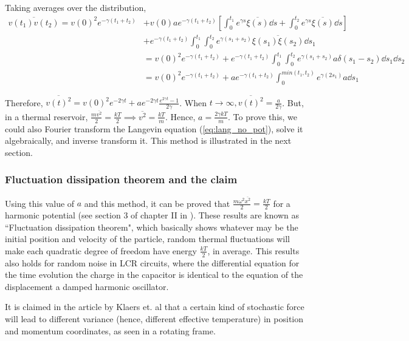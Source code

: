 \documentclass[12pt, twoside]{article}
\begin{document}
Taking averages over the distribution,\\
$\begin{aligned}\overline{v(t_1) v(t_2)} = v(0)^2 e^{-\gamma(t_1 + t_2)} &+ v(0) a e^{-\gamma(t_1 + t_2)} \left[\int_{0}^{t_1} e^{\gamma s} \overline{\xi(s)} \dd{s} + \int_{0}^{t_2} e^{\gamma s} \overline{\xi(s)} \dd{s}\right] \\&+ e^{-\gamma(t_1 + t_2)} \int_{0}^{t_1}\int_{0}^{t_2} e^{\gamma(s_1 + s_2)} \overline{\xi(s_1)\xi(s_2)} \dd{s_1} \\ &= v(0)^2 e^{-\gamma(t_1 + t_2)} + e^{-\gamma(t_1 + t_2)} \int_{0}^{t_1}\int_{0}^{t_2} e^{\gamma(s_1 + s_2)} {a} \delta(s_1 - s_2) \dd{s_1} \dd{s_2} \\ &= v(0)^2 e^{-\gamma(t_1 + t_2)} + a  e^{-\gamma(t_1 + t_2)} \int_{0}^{min(t_1,t_2)} e^{\gamma(2 s_1)} {a} \dd{s_1} \end{aligned}$

Therefore, $\overline{v(t)^2} = v(0)^2 e^{-2\gamma t} + a e^{-2\gamma t}\frac{e^{2\gamma t} - 1}{2\gamma}$. When $t \rightarrow \infty, \overline{v(t)^2} = \frac{a}{2\gamma}$. But, in a thermal reservoir, $\frac{m\overline{v^2}}{2} =\frac{k T}{2} \implies \overline{v^2} = \frac{kT}{m}$. Hence, $a = \frac{2 \gamma k T}{m}$. To prove this, we could also Fourier transform the Langevin equation (\ref{eq:lang_no_pot}), solve it algebraically, and inverse transform it. This method is illustrated in the next section.
\subsubsection{Fluctuation dissipation theorem and the claim}
Using this value of $a$ and this method, it can be proved that $\frac{m \omega^2 \overline{x^2}}{2} = \frac{k T}{2}$ for a harmonic potential (see section 3 of chapter II in \cite{chandrashekhar_stochastic_physics_astro}). These results are known as ``Fluctuation dissipation theorem", which basically shows whatever may be the initial position and velocity of the particle, random thermal fluctuations will make each quadratic degree of freedom have energy $\frac{kT}{2}$, in average. This results also holds for random noise in LCR circuits, where the differential equation for the time evolution the charge in the capacitor is identical to the equation of the displacement a damped harmonic oscillator. 

It is claimed in the article by Klaers et. al \cite{klaers} that a certain kind of stochastic force will lead to different variance (hence, different effective temperature) in position and momentum coordinates, as seen in a rotating frame.
\end{document}
